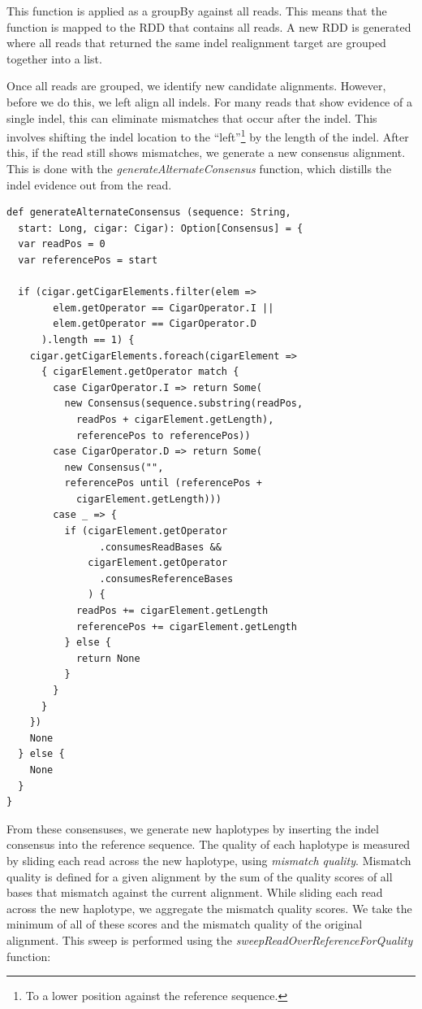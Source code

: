 \documentclass{acm_proc_article-sp}
\begin{document}
This function is applied as a groupBy against all reads. This means that the function is mapped to the RDD that contains all reads. A new RDD is generated where all
reads that returned the same indel realignment target are grouped together into a list.

Once all reads are grouped, we identify new candidate alignments. However, before we do this, we left align all indels. For many reads that show evidence of a single
indel, this can eliminate mismatches that occur after the indel. This involves shifting the indel location to the ``left''\footnote{To a lower position against the reference
sequence.} by the length of the indel. After this, if the read still shows mismatches, we generate a new consensus alignment. This is done with the
\emph{generateAlternateConsensus} function, which distills the indel evidence out from the read.

\begin{lstlisting}
def generateAlternateConsensus (sequence: String,
  start: Long, cigar: Cigar): Option[Consensus] = {
  var readPos = 0
  var referencePos = start

  if (cigar.getCigarElements.filter(elem =>
        elem.getOperator == CigarOperator.I ||
        elem.getOperator == CigarOperator.D
      ).length == 1) {
    cigar.getCigarElements.foreach(cigarElement =>
      { cigarElement.getOperator match {
        case CigarOperator.I => return Some(
          new Consensus(sequence.substring(readPos,
            readPos + cigarElement.getLength),
            referencePos to referencePos))
        case CigarOperator.D => return Some(
          new Consensus("",
          referencePos until (referencePos +
            cigarElement.getLength)))
        case _ => {
          if (cigarElement.getOperator
                .consumesReadBases &&
              cigarElement.getOperator
                .consumesReferenceBases
              ) {
            readPos += cigarElement.getLength
            referencePos += cigarElement.getLength
          } else {
            return None
          }
        }
      }
    })
    None
  } else {
    None
  }
}
\end{lstlisting}

From these consensuses, we generate new haplotypes by inserting the indel consensus into the reference sequence. The quality of each haplotype is measured
by sliding each read across the new haplotype, using \emph{mismatch quality}. Mismatch quality is defined for a given alignment by the sum of the quality scores
of all bases that mismatch against the current alignment. While sliding each read across the new haplotype, we aggregate the mismatch quality scores. We take
the minimum of all of these scores and the mismatch quality of the original alignment. This sweep is performed using the \emph{sweepReadOverReferenceForQuality}
function:
\end{document}

